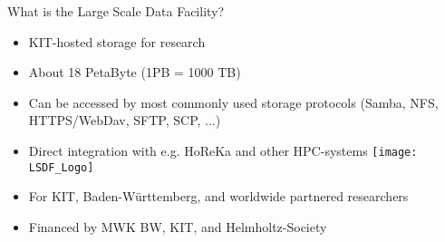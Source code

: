 \newcommand{\backupbegin}{
   \newcounter{finalframe}
   \setcounter{finalframe}{\value{framenumber}}
}

\newcommand{\backupend}{
   \setcounter{framenumber}{\value{finalframe}}
}


\newcommand{\mailto}[1]{
    \href{mailto:#1}{#1}
}

\newcommand{\todo}[1]{
    {\Large\color{red}{(TODO: #1)}}
}



\newcommand{\green}[1]{
    \textcolor{green1}{#1}
}
\newcommand{\blue}[1]{
    \textcolor{blue1}{#1}
}
\newcommand{\vio}[1]{
    \textcolor{violet1}{#1}
}
\newcommand{\orang}[1]{
    \textcolor{orang1}{#1}
}





\maketitle
\addtocounter{framenumber}{1}

\begin{frame}[c]{What is the Large Scale Data Facility?}
    \begin{multicols}{2}
    \begin{itemize}[<+(1)->]
        \item KIT-hosted storage for research
        \item About 18 PetaByte (1PB = 1000 TB)
        \item Can be accessed by most commonly used storage protocols (Samba, NFS, HTTPS/WebDav, SFTP, SCP, ...)
        \item Direct integration with e.g. HoReKa and other HPC-systems
    \texttt{[image: LSDF\_Logo]}
        \item For KIT, Baden-Württemberg, and worldwide partnered researchers
        \item Financed by MWK BW, KIT, and Helmholtz-Society
    \end{itemize}
    \end{multicols}
\end{frame}

